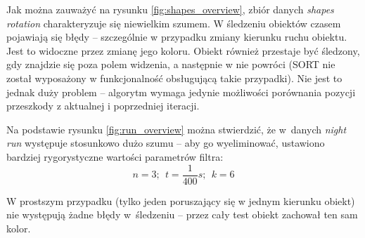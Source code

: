 \vspace{11px}

Jak można zauważyć na rysunku \ref{fig:shapes_overview}, zbiór danych \textit{shapes rotation} charakteryzuje się niewielkim szumem.
W śledzeniu obiektów czasem pojawiają się błędy -- szczególnie w przypadku zmiany kierunku ruchu obiektu. Jest to widoczne przez zmianę jego koloru. Obiekt również przestaje być śledzony, gdy znajdzie się poza polem widzenia, a następnie w nie powróci (SORT nie został wyposażony w funkcjonalność obsługującą takie przypadki). Nie jest to jednak duży problem -- algorytm wymaga jedynie możliwości porównania pozycji przeszkody z aktualnej i poprzedniej iteracji.

\vspace{11px}

Na podstawie rysunku \ref{fig:run_overview} można stwierdzić, że w~danych \textit{night run} występuje stosunkowo dużo szumu -- aby go wyeliminować, ustawiono bardziej rygorystyczne wartości parametrów filtra:
$$n=3; ~~t=\frac{1}{400}s; ~~k=6$$

W prostszym przypadku (tylko jeden poruszający się w jednym kierunku obiekt) nie występują żadne błędy w~śledzeniu -- przez cały test obiekt zachował ten sam kolor.


